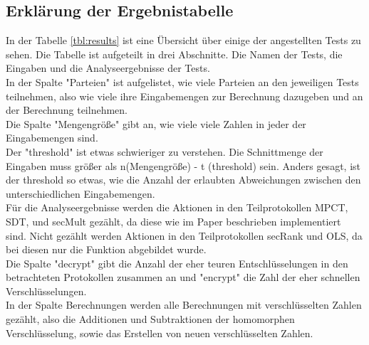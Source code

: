 \subsection{Erklärung der Ergebnistabelle}
In der Tabelle \ref{tbl:results} ist eine Übersicht über einige der angestellten Tests zu sehen. Die Tabelle ist aufgeteilt in drei Abschnitte. Die Namen der Tests, die Eingaben und die Analyseergebnisse der Tests.\\
In der Spalte "Parteien" ist aufgelistet, wie viele Parteien an den jeweiligen Tests teilnehmen, also wie viele ihre Eingabemengen zur Berechnung dazugeben und an der Berechnung teilnehmen.\\
Die Spalte "Mengengröße" gibt an, wie viele viele Zahlen in jeder der Eingabemengen sind.\\
Der "threshold" ist etwas schwieriger zu verstehen. Die Schnittmenge der Eingaben muss größer als n(Mengengröße) - t (threshold) sein. Anders gesagt, ist der threshold so etwas, wie die Anzahl der erlaubten Abweichungen zwischen den unterschiedlichen Eingabemengen.\\
Für die Analyseergebnisse werden die Aktionen in den Teilprotokollen MPCT, SDT, und secMult gezählt, da diese wie im Paper \cite{Doettling2021} beschrieben implementiert sind. Nicht gezählt werden Aktionen in den Teilprotokollen secRank und OLS, da bei diesen nur die Funktion abgebildet wurde.\\
Die Spalte "decrypt" gibt die Anzahl der eher teuren Entschlüsselungen in den betrachteten Protokollen zusammen an und "encrypt" die Zahl der eher schnellen Verschlüsselungen.\\
In der Spalte Berechnungen werden alle Berechnungen mit verschlüsselten Zahlen gezählt, also die Additionen und Subtraktionen der homomorphen Verschlüsselung, sowie das Erstellen von neuen verschlüsselten Zahlen.\\

